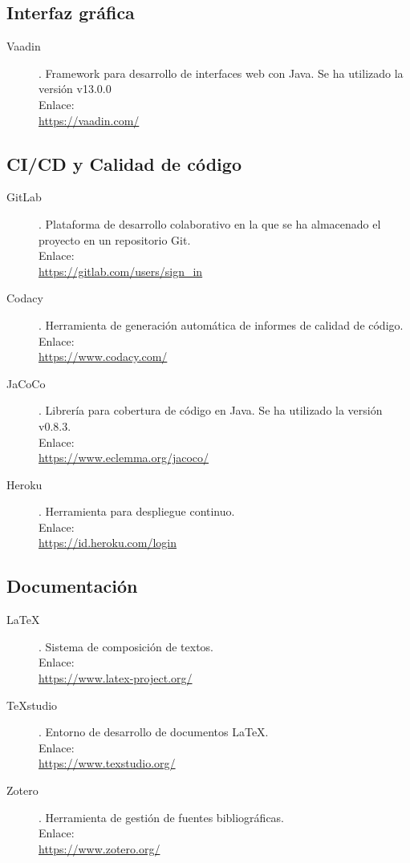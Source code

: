 \subsection{Interfaz gráfica}
\begin{description}
	\item[Vaadin]. Framework para desarrollo de interfaces web con Java. Se ha utilizado la versión  v13.0.0\\ Enlace:\\ \url{https://vaadin.com/}
\end{description}
\subsection{CI/CD y Calidad de código}
\begin{description}
	\item[GitLab]. Plataforma de desarrollo colaborativo en la que se ha almacenado el proyecto en un repositorio Git.\\ Enlace:\\ \url{https://gitlab.com/users/sign_in}
	\item[Codacy]. Herramienta de generación automática de informes de calidad de código.\\ Enlace:\\ \url{https://www.codacy.com/}
	\item[JaCoCo]. Librería para cobertura de código en Java. Se ha utilizado la versión v0.8.3.\\ Enlace:\\ \url{https://www.eclemma.org/jacoco/}
	\item[Heroku]. Herramienta para despliegue continuo.\\ Enlace:\\ \url{https://id.heroku.com/login}
\end{description}
\subsection{Documentación}
\begin{description}
	\item[LaTeX]. Sistema de composición de textos.\\ Enlace:\\ \url{https://www.latex-project.org/}
	\item[TeXstudio]. Entorno de desarrollo de documentos LaTeX.\\ Enlace:\\ \url{https://www.texstudio.org/}
	\item[Zotero]. Herramienta de gestión de fuentes bibliográficas.\\ Enlace:\\ \url{https://www.zotero.org/}
\end{description}
